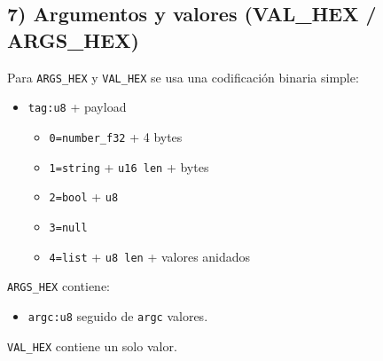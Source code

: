 \subsection*{7) Argumentos y valores (VAL\_HEX / ARGS\_HEX)}
Para \texttt{ARGS\_HEX} y \texttt{VAL\_HEX} se usa una codificación binaria simple:
\begin{itemize}
    \item \texttt{tag:u8} + payload
          \begin{itemize}
              \item \texttt{0=number\_f32} + 4 bytes
              \item \texttt{1=string} + \texttt{u16 len} + bytes
              \item \texttt{2=bool} + \texttt{u8}
              \item \texttt{3=null}
              \item \texttt{4=list} + \texttt{u8 len} + valores anidados
          \end{itemize}
\end{itemize}

\texttt{ARGS\_HEX} contiene:
\begin{itemize}
    \item \texttt{argc:u8} seguido de \texttt{argc} valores.
\end{itemize}

\texttt{VAL\_HEX} contiene un solo valor.